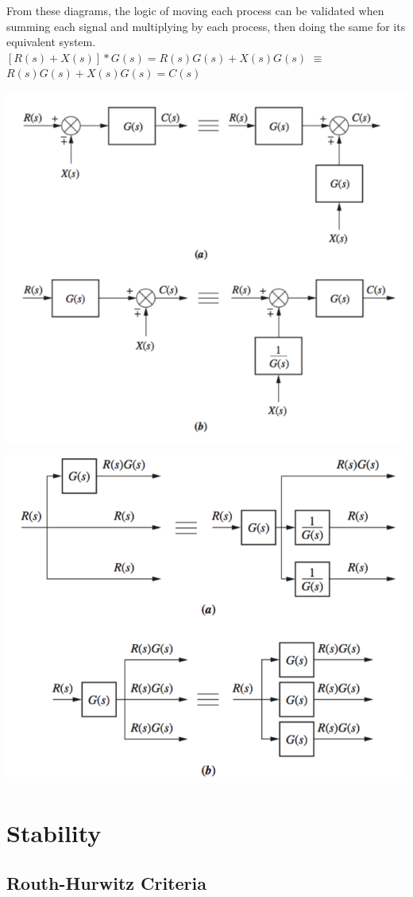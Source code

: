 \documentclass[11pt]{article}
\begin{document}
    From these diagrams, the logic of moving each process can be validated when summing each signal and multiplying by each process, then doing the same for its equivalent system. \\
    
    $[R(s) + X(s)] * G(s) = R(s)G(s) + X(s)G(s)$  $\equiv$
    $R(s)G(s) + X(s)G(s) = C(s)$

    \begin{center}
        \includegraphics[width=300 px]{img/move1}
        \includegraphics[width=300 px]{img/move2}
    \end{center}
    
    \pagebreak


    \section{Stability}
    \subsection{Routh-Hurwitz Criteria}
\end{document}

